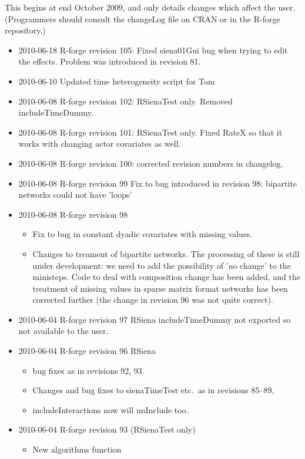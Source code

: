 \documentclass[a4paper,fleqn]{article}
\newcommand{\+}{\, + \,}
\newcommand{\sfn}[1]{\textsf{#1}}
\begin{document}
{This begins at end October 2009, and only details changes which affect the user.
(Programmers should consult the changeLog file on CRAN or in the R-forge
repository.)
\begin{itemize}
\item 2010-06-18 R-forge revision 105: Fixed siena01Gui bug when trying to edit
  the effects. Problem was introduced in revision 81. 
\item 2010-06-10 Updated time heterogeneity script for Tom
\item 2010-06-08 R-forge revision 102: RSienaTest only. Removed 
includeTimeDummy. 
\item 2010-06-08 R-forge revision 101: RSienaTest only. Fixed RateX so that it
  works with changing actor covariates as well.
\item 2010-06-08 R-forge revision 100: corrected revision numbers in changelog.
\item 2010-06-08 R-forge revision 99
Fix to bug introduced in revision 98: bipartite networks could not have 'loops'
\item 2010-06-08 R-forge revision 98
\begin{itemize}
\item Fix to bug in constant dyadic
  covariates with missing values.
\item Changes to treament of bipartite networks. The processing of these is
  still under development: we need to add the possibility of 'no change' to the
  ministeps. Code to deal with composition change has been added, and the
  treatment of missing values in sparse matrix format networks has been
  corrected further (the change in revision 96 was not quite correct).
\end{itemize}
\item 2010-06-04 R-forge revision 97 RSiena includeTimeDummy not exported so not
  available to the user.
\item 2010-06-04 R-forge revision 96 RSiena
\begin{itemize}
\item bug fixes as in revisions 92, 93.
\item Changes and bug fixes to sienaTimeTest etc.\ as in revisions 85--89,
\item \sfn{includeInteractions} now will unInclude too.
\end{itemize}
\item 2010-06-04 R-forge revision 93 (RSienaTest only)
\begin{itemize}\item New algorithms function

\end{itemize}
\end{itemize}}
\end{document}
